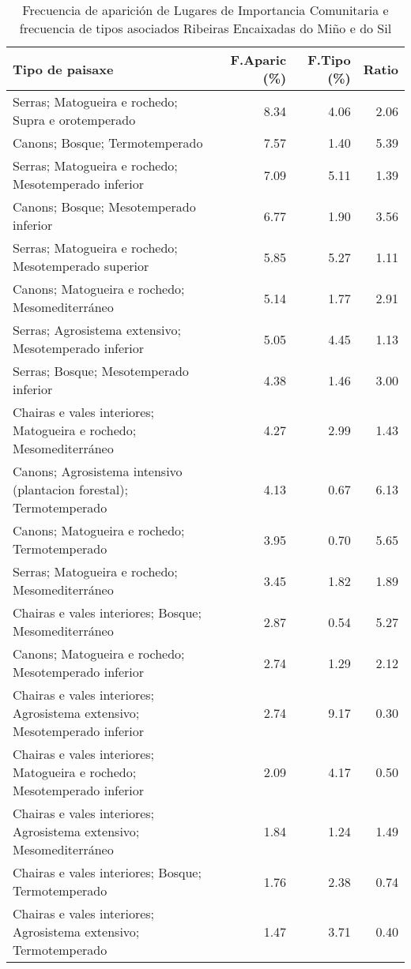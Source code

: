 \begin{table}[p]
\centering
\caption{Frecuencia de aparición de Lugares de Importancia Comunitaria e frecuencia de tipos asociados Ribeiras Encaixadas do Miño e do Sil} 
\label{vnatura4}
\begin{tabular}{lrrr}
  \hline
Tipo de paisaxe & F.Aparic (\%) & F.Tipo (\%) & Ratio \\ 
  \hline
Serras; Matogueira e rochedo; Supra e orotemperado & 8.34 & 4.06 & 2.06 \\ 
  Canons; Bosque; Termotemperado & 7.57 & 1.40 & 5.39 \\ 
  Serras; Matogueira e rochedo; Mesotemperado inferior & 7.09 & 5.11 & 1.39 \\ 
  Canons; Bosque; Mesotemperado inferior & 6.77 & 1.90 & 3.56 \\ 
  Serras; Matogueira e rochedo; Mesotemperado superior & 5.85 & 5.27 & 1.11 \\ 
  Canons; Matogueira e rochedo; Mesomediterráneo & 5.14 & 1.77 & 2.91 \\ 
  Serras; Agrosistema extensivo; Mesotemperado inferior & 5.05 & 4.45 & 1.13 \\ 
  Serras; Bosque; Mesotemperado inferior & 4.38 & 1.46 & 3.00 \\ 
  Chairas e vales interiores; Matogueira e rochedo; Mesomediterráneo & 4.27 & 2.99 & 1.43 \\ 
  Canons; Agrosistema intensivo (plantacion forestal); Termotemperado & 4.13 & 0.67 & 6.13 \\ 
  Canons; Matogueira e rochedo; Termotemperado & 3.95 & 0.70 & 5.65 \\ 
  Serras; Matogueira e rochedo; Mesomediterráneo & 3.45 & 1.82 & 1.89 \\ 
  Chairas e vales interiores; Bosque; Mesomediterráneo & 2.87 & 0.54 & 5.27 \\ 
  Canons; Matogueira e rochedo; Mesotemperado inferior & 2.74 & 1.29 & 2.12 \\ 
  Chairas e vales interiores; Agrosistema extensivo; Mesotemperado inferior & 2.74 & 9.17 & 0.30 \\ 
  Chairas e vales interiores; Matogueira e rochedo; Mesotemperado inferior & 2.09 & 4.17 & 0.50 \\ 
  Chairas e vales interiores; Agrosistema extensivo; Mesomediterráneo & 1.84 & 1.24 & 1.49 \\ 
  Chairas e vales interiores; Bosque; Termotemperado & 1.76 & 2.38 & 0.74 \\ 
  Chairas e vales interiores; Agrosistema extensivo; Termotemperado & 1.47 & 3.71 & 0.40 \\ 

\end{tabular}
\end{table}
